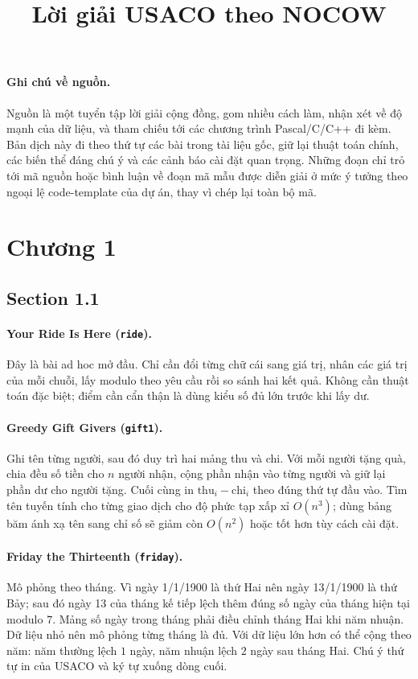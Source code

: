 \documentclass[11pt]{article}
\title{Lời giải USACO theo NOCOW}
\author{}
\date{}
\newcommand{\problem}[2]{\paragraph{#1 (\texttt{#2}).}}
\newcommand{\bigO}[1]{\ensuremath{O(#1)}}
\begin{document}
\maketitle


\paragraph{Ghi chú về nguồn.}
Nguồn là một tuyển tập lời giải cộng đồng, gom nhiều cách làm, nhận xét về
độ mạnh của dữ liệu, và tham chiếu tới các chương trình Pascal/C/C++ đi kèm.
Bản dịch này đi theo thứ tự các bài trong tài liệu gốc, giữ lại thuật toán
chính, các biến thể đáng chú ý và các cảnh báo cài đặt quan trọng. Những đoạn
chỉ trỏ tới mã nguồn hoặc bình luận về đoạn mã mẫu được diễn giải ở mức ý
tưởng theo ngoại lệ code-template của dự án, thay vì chép lại toàn bộ mã.

\section*{Chương 1}

\subsection*{Section 1.1}

\problem{Your Ride Is Here}{ride}
Đây là bài ad hoc mở đầu. Chỉ cần đổi từng chữ cái sang giá trị, nhân các giá trị của mỗi chuỗi, lấy modulo theo yêu cầu rồi so sánh hai kết quả. Không cần thuật toán đặc biệt; điểm cần cẩn thận là dùng kiểu số đủ lớn trước khi lấy dư.

\problem{Greedy Gift Givers}{gift1}
Ghi tên từng người, sau đó duy trì hai mảng thu và chi. Với mỗi người tặng quà, chia đều số tiền cho \(n\) người nhận, cộng phần nhận vào từng người và giữ lại phần dư cho người tặng. Cuối cùng in \(\text{thu}_i-\text{chi}_i\) theo đúng thứ tự đầu vào. Tìm tên tuyến tính cho từng giao dịch cho độ phức tạp xấp xỉ \(\bigO{n^3}\); dùng bảng băm ánh xạ tên sang chỉ số sẽ giảm còn \(\bigO{n^2}\) hoặc tốt hơn tùy cách cài đặt.

\problem{Friday the Thirteenth}{friday}
Mô phỏng theo tháng. Vì ngày 1/1/1900 là thứ Hai nên ngày 13/1/1900 là thứ Bảy; sau đó ngày 13 của tháng kế tiếp lệch thêm đúng số ngày của tháng hiện tại modulo \(7\). Mảng số ngày trong tháng phải điều chỉnh tháng Hai khi năm nhuận. Dữ liệu nhỏ nên mô phỏng từng tháng là đủ. Với dữ liệu lớn hơn có thể cộng theo năm: năm thường lệch \(1\) ngày, năm nhuận lệch \(2\) ngày sau tháng Hai. Chú ý thứ tự in của USACO và ký tự xuống dòng cuối.
\end{document}
